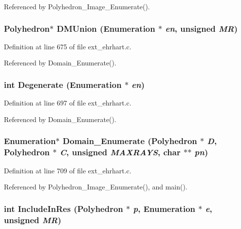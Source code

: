Referenced by Polyhedron\_\-Image\_\-Enumerate().

\subsubsection{\setlength{\rightskip}{0pt plus 5cm}Polyhedron$\ast$ DMUnion (Enumeration $\ast$ {\em en}, unsigned {\em MR})}\label{ext__ehrhart_8c_a16}




Definition at line 675 of file ext\_\-ehrhart.c.

Referenced by Domain\_\-Enumerate().

\subsubsection{\setlength{\rightskip}{0pt plus 5cm}int Degenerate (Enumeration $\ast$ {\em en})}\label{ext__ehrhart_8c_a18}




Definition at line 697 of file ext\_\-ehrhart.c.

Referenced by Domain\_\-Enumerate().

\subsubsection{\setlength{\rightskip}{0pt plus 5cm}Enumeration$\ast$ Domain\_\-Enumerate (Polyhedron $\ast$ {\em D}, Polyhedron $\ast$ {\em C}, unsigned {\em MAXRAYS}, char $\ast$$\ast$ {\em pn})}\label{ext__ehrhart_8c_a19}




Definition at line 709 of file ext\_\-ehrhart.c.

Referenced by Polyhedron\_\-Image\_\-Enumerate(), and main().

\subsubsection{\setlength{\rightskip}{0pt plus 5cm}int Include\-In\-Res (Polyhedron $\ast$ {\em p}, Enumeration $\ast$ {\em e}, unsigned {\em MR})}\label{ext__ehrhart_8c_a15}




